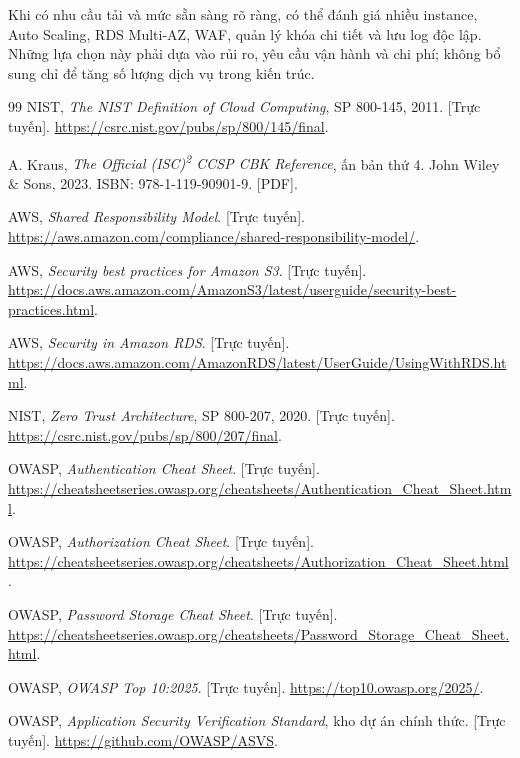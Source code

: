Khi có nhu cầu tải và mức sẵn sàng rõ ràng, có thể đánh giá nhiều instance, Auto Scaling, RDS Multi-AZ, WAF, quản lý khóa chi tiết và lưu log độc lập. Những lựa chọn này phải dựa vào rủi ro, yêu cầu vận hành và chi phí; không bổ sung chỉ để tăng số lượng dịch vụ trong kiến trúc.
\clearpage
{}
\begin{thebibliography}{99}
\small
{} NIST, \textit{The NIST Definition of Cloud Computing}, SP 800-145, 2011. [Trực tuyến]. \url{https://csrc.nist.gov/pubs/sp/800/145/final}.

 A. Kraus, \textit{The Official (ISC)\textsuperscript{2} CCSP CBK Reference}, ấn bản thứ 4. John Wiley \& Sons, 2023. ISBN: 978-1-119-90901-9. [PDF].

 AWS, \textit{Shared Responsibility Model}. [Trực tuyến]. \url{https://aws.amazon.com/compliance/shared-responsibility-model/}.

 AWS, \textit{Security best practices for Amazon S3}. [Trực tuyến]. \url{https://docs.aws.amazon.com/AmazonS3/latest/userguide/security-best-practices.html}.

 AWS, \textit{Security in Amazon RDS}. [Trực tuyến]. \url{https://docs.aws.amazon.com/AmazonRDS/latest/UserGuide/UsingWithRDS.html}.

 NIST, \textit{Zero Trust Architecture}, SP 800-207, 2020. [Trực tuyến]. \url{https://csrc.nist.gov/pubs/sp/800/207/final}.

 OWASP, \textit{Authentication Cheat Sheet}. [Trực tuyến]. \url{https://cheatsheetseries.owasp.org/cheatsheets/Authentication_Cheat_Sheet.html}.

 OWASP, \textit{Authorization Cheat Sheet}. [Trực tuyến]. \url{https://cheatsheetseries.owasp.org/cheatsheets/Authorization_Cheat_Sheet.html}.

 OWASP, \textit{Password Storage Cheat Sheet}. [Trực tuyến]. \url{https://cheatsheetseries.owasp.org/cheatsheets/Password_Storage_Cheat_Sheet.html}.

 OWASP, \textit{OWASP Top 10:2025}. [Trực tuyến]. \url{https://top10.owasp.org/2025/}.

 OWASP, \textit{Application Security Verification Standard}, kho dự án chính thức. [Trực tuyến]. \url{https://github.com/OWASP/ASVS}.


\end{thebibliography}
